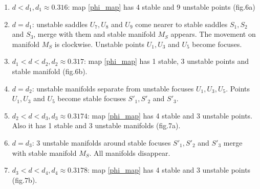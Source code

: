 \documentclass[12pt]{amsart}
\begin{document}
\begin{enumerate}

\item $ d < d_1, d_1\approx0.316 $: map \eqref{phi_map} has 4 stable and 9 unstable points (fig.6a)
\item $ d = d_1 $: unstable saddles $ U_7, U_8 $ and $ U_9 $ come nearer to stable saddles $ S_1, S_2 $ and $ S_3 $, merge with them and stable manifold $ M_S $ appears. The movement on manifold $ M_S $ is clockwise. Unstable points $ U_1, U_3 $ and $ U_5 $ become focuses.
\item $ d_1 < d < d_2, d_2\approx0.317 $: map \eqref{phi_map} has 1 stable, 3 unstable points and stable manifold (fig.6b).
\item $ d = d_2 $: unstable manifolds separate from unstable focuses $ U_1, U_3, U_5 $. Points $ U_1, U_3 $ and $ U_5 $ become stable focuses $ S'_1, S'_2 $ and $ S'_3 $.
\item $ d_2 < d < d_3, d_3\approx0.3174 $: map \eqref{phi_map} has 4 stable and 3 unstable points. Also it has 1 stable and 3 unstable manifolds (fig.7a).
\item $ d = d_3 $: 3 unstable manifolds around stable focuses $ S'_1, S'_2 $ and $ S'_3 $ merge with stable manifold $ M_S $. All manifolds disappear.
\item $ d_3 < d < d_4, d_4\approx0.3178 $: map \eqref{phi_map} has 4 stable and 3 unstable points (fig.7b).


\end{enumerate}
\end{document}
